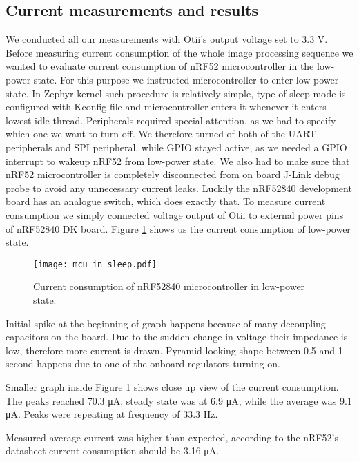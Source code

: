 \subsection{ Current measurements and results}

We conducted all our measurements with Otii's output voltage set to 3.3 V.
Before measuring current consumption of the whole image processing sequence we wanted to evaluate current consumption of nRF52 microcontroller in the low-power state.
For this purpose we instructed microcontroller to enter low-power state.
In Zephyr kernel such procedure is relatively simple, type of sleep mode is configured with Kconfig file and microcontroller enters it whenever it enters lowest idle thread.
Peripherals required special attention, as we had to specify which one we want to turn off.
We therefore turned of both of the UART peripherals and SPI peripheral, while GPIO stayed active, as we needed a GPIO interrupt to wakeup nRF52 from low-power state.
We also had to make sure that nRF52 microcontroller is completely disconnected from on board J-Link debug probe to avoid any unnecessary current leaks.
Luckily the nRF52840 development board has an analogue switch, which does exactly that.
To measure current consumption we simply connected voltage output of Otii to external power pins of nRF52840 DK board.
Figure \ref{mcu_in_sleep} shows us the current consumption of low-power state.

\begin{figure}[ht]
    \centering
    \texttt{[image: mcu\_in\_sleep.pdf]}
    \caption{ Current consumption of nRF52840 microcontroller in low-power state.}
    \label{mcu_in_sleep}
\end{figure}

Initial spike at the beginning of graph happens because of many decoupling capacitors on the board.
Due to the sudden change in voltage their impedance is low, therefore more current is drawn.
Pyramid looking shape between 0.5 and 1 second happens due to one of the onboard regulators turning on.

Smaller graph inside Figure \ref{mcu_in_sleep} shows close up view of the current consumption.
The peaks reached 70.3 \si{\micro\ampere}, steady state was at 6.9 \si{\micro\ampere}, while the average was 9.1 \si{\micro\ampere}.
Peaks were repeating at frequency of 33.3 \si{\hertz}.

Measured average current was higher than expected, according to the nRF52's datasheet\cite{nrf52_datasheet} current consumption should be 3.16 \si{\micro\ampere}\footnotemark.

